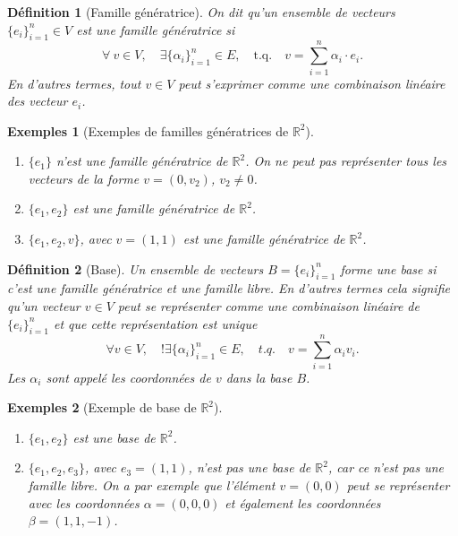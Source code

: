 \documentclass[a4paper,12pt]{book}
\newcommand{\real}{\mathbb{R}}
\newtheorem{definition}{Définition}
\newtheorem*{exemples}{Exemples}
\begin{document}
\begin{definition}[Famille génératrice]
 On dit qu'un ensemble de vecteurs $\{e_i\}_{i=1}^n\in V$ est une famille génératrice si 
 \begin{equation}
\forall\ v\in V,\quad \exists \{\alpha_i\}_{i=1}^n\in E,\quad \mbox{t.q.}\quad v=\sum_{i=1}^n\alpha_i\cdot e_i.
 \end{equation}
 En d'autres termes, tout $v\in V$ peut s'exprimer comme une combinaison linéaire des vecteur $e_i$.
\end{definition}
\begin{exemples}[Exemples de familles génératrices de $\real^2$]\hfill\break
\begin{enumerate}
 \item $\{e_1\}$ n'est une famille génératrice de $\real^2$. On ne peut pas représenter tous les vecteurs de la forme $v=(0,v_2)$, $v_2\neq 0$.
 \item $\{e_1,e_2\}$ est une famille génératrice de $\real^2$.
 \item $\{e_1,e_2,v\}$, avec $v=(1,1)$ est une famille génératrice de $\real^2$.
\end{enumerate}
\end{exemples}

\begin{definition}[Base]
 Un ensemble de vecteurs $B=\{e_i\}_{i=1}^n$ forme une base si c'est une famille génératrice et une famille libre. En d'autres termes
 cela signifie qu'un vecteur $v\in V$ peut se représenter comme une combinaison linéaire de $\{e_i\}_{i=1}^n$ et que 
 cette représentation est unique
 \begin{equation}
  \forall v\in V, \quad !\exists \{\alpha_i\}_{i=1}^n\in E,\quad t.q.\quad v=\sum_{i=1}^n\alpha_i v_i.
 \end{equation}
Les $\alpha_i$ sont appelé les coordonnées de $v$ dans la base $B$.
\end{definition}
\begin{exemples}[Exemple de base de $\real^2$]\hfill\break
\begin{enumerate}
 \item $\{e_1,e_2\}$ est une base de $\real^2$.
 \item $\{e_1,e_2,e_3\}$, avec $e_3=(1,1)$,  n'est pas une base de $\real^2$, car ce n'est pas une famille libre.
 On a par exemple que l'élément $v=(0,0)$ peut se représenter avec les coordonnées $\alpha=(0,0,0)$ et également
 les coordonnées $\beta=(1,1,-1)$.
\end{enumerate}
\end{exemples}
\end{document}
